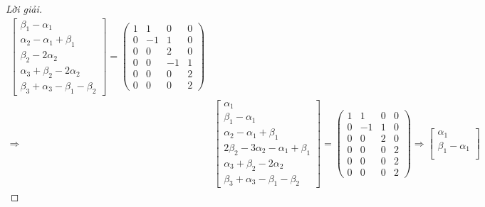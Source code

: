 \documentclass[class=linearalgebra,crop=false]{standalone}
\begin{document}
\begin{proof}[Lời giải]
\begin{align*}
\begin{bmatrix}
            \beta_{1} - \alpha_{1}               \\
            \alpha_{2} - \alpha_{1} + \beta_{1}  \\
            \beta_{2} - 2\alpha_{2}              \\
            \alpha_{3} + \beta_{2} - 2\alpha_{2} \\
            \beta_{3} + \alpha_{3} - \beta_{1} - \beta_{2}
        \end{bmatrix}=
        \begin{pmatrix}
            1 & 1  & 0  & 0 \\
            0 & -1 & 1  & 0 \\
            0 & 0  & 2  & 0 \\
            0 & 0  & -1 & 1 \\
            0 & 0  & 0  & 2 \\
            0 & 0  & 0  & 2
        \end{pmatrix}                    \\
        \Longrightarrow &
        \begin{bmatrix}
            \alpha_{1}                                        \\
            \beta_{1} - \alpha_{1}                            \\
            \alpha_{2} - \alpha_{1} + \beta_{1}               \\
            2\beta_{2} - 3\alpha_{2} - \alpha_{1} + \beta_{1} \\
            \alpha_{3} + \beta_{2} - 2\alpha_{2}              \\
            \beta_{3} + \alpha_{3} - \beta_{1} - \beta_{2}
        \end{bmatrix}=
        \begin{pmatrix}
            1 & 1  & 0 & 0 \\
            0 & -1 & 1 & 0 \\
            0 & 0  & 2 & 0 \\
            0 & 0  & 0 & 2 \\
            0 & 0  & 0 & 2 \\
            0 & 0  & 0 & 2
        \end{pmatrix}
        \Longrightarrow
        \begin{bmatrix}
            \alpha_{1}                                                   \\
            \beta_{1} - \alpha_{1}                                       \\

\end{bmatrix}
\end{align*}
\end{proof}
\end{document}
